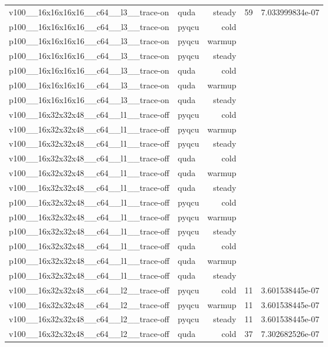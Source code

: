 \begin{table}[htbp]
\begin{tabular}{@{}llrrr@{}}
v100\_\_16x16x16x16\_\_c64\_\_l3\_\_trace-on & quda & steady & 59 & 7.033999834e-07 \\
p100\_\_16x16x16x16\_\_c64\_\_l3\_\_trace-on & pyqcu & cold &  &  \\
p100\_\_16x16x16x16\_\_c64\_\_l3\_\_trace-on & pyqcu & warmup &  &  \\
p100\_\_16x16x16x16\_\_c64\_\_l3\_\_trace-on & pyqcu & steady &  &  \\
p100\_\_16x16x16x16\_\_c64\_\_l3\_\_trace-on & quda & cold &  &  \\
p100\_\_16x16x16x16\_\_c64\_\_l3\_\_trace-on & quda & warmup &  &  \\
p100\_\_16x16x16x16\_\_c64\_\_l3\_\_trace-on & quda & steady &  &  \\
v100\_\_16x32x32x48\_\_c64\_\_l1\_\_trace-off & pyqcu & cold &  &  \\
v100\_\_16x32x32x48\_\_c64\_\_l1\_\_trace-off & pyqcu & warmup &  &  \\
v100\_\_16x32x32x48\_\_c64\_\_l1\_\_trace-off & pyqcu & steady &  &  \\
v100\_\_16x32x32x48\_\_c64\_\_l1\_\_trace-off & quda & cold &  &  \\
v100\_\_16x32x32x48\_\_c64\_\_l1\_\_trace-off & quda & warmup &  &  \\
v100\_\_16x32x32x48\_\_c64\_\_l1\_\_trace-off & quda & steady &  &  \\
p100\_\_16x32x32x48\_\_c64\_\_l1\_\_trace-off & pyqcu & cold &  &  \\
p100\_\_16x32x32x48\_\_c64\_\_l1\_\_trace-off & pyqcu & warmup &  &  \\
p100\_\_16x32x32x48\_\_c64\_\_l1\_\_trace-off & pyqcu & steady &  &  \\
p100\_\_16x32x32x48\_\_c64\_\_l1\_\_trace-off & quda & cold &  &  \\
p100\_\_16x32x32x48\_\_c64\_\_l1\_\_trace-off & quda & warmup &  &  \\
p100\_\_16x32x32x48\_\_c64\_\_l1\_\_trace-off & quda & steady &  &  \\
v100\_\_16x32x32x48\_\_c64\_\_l2\_\_trace-off & pyqcu & cold & 11 & 3.601538445e-07 \\
v100\_\_16x32x32x48\_\_c64\_\_l2\_\_trace-off & pyqcu & warmup & 11 & 3.601538445e-07 \\
v100\_\_16x32x32x48\_\_c64\_\_l2\_\_trace-off & pyqcu & steady & 11 & 3.601538445e-07 \\
v100\_\_16x32x32x48\_\_c64\_\_l2\_\_trace-off & quda & cold & 37 & 7.302682526e-07 \\

\end{tabular}
\end{table}
